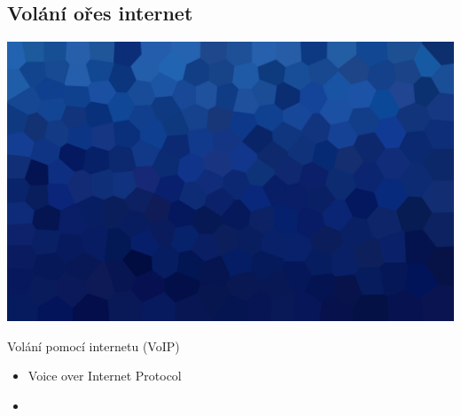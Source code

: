 \documentclass[aspectratio=169,xcolor=dvipsnames, t]{beamer}
\begin{document}
\subsection{Volání ořes internet}
{
    \includegraphics[width=\paperwidth,height=\paperheight]{AICStyleData/logos/mene_polygonu_bg.png}
}
\begin{frame}{Volání pomocí internetu (VoIP)}
    \begin{itemize}
        \item Voice over Internet Protocol
        \item 
    \end{itemize}

\end{frame}


\makefinalpage
\end{document}
